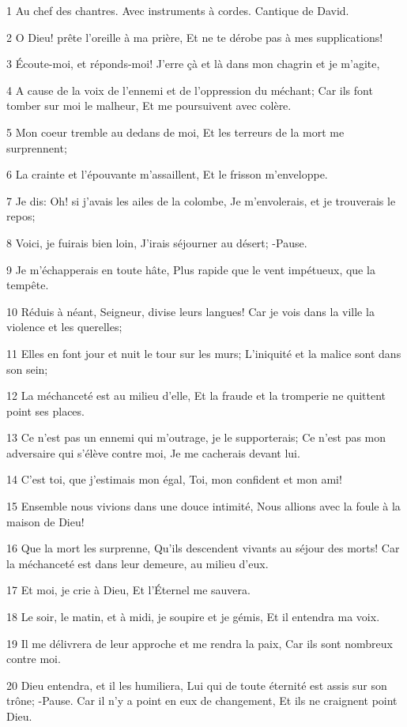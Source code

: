 \par 1 Au chef des chantres. Avec instruments à cordes. Cantique de David.
\par 2 O Dieu! prête l'oreille à ma prière, Et ne te dérobe pas à mes supplications!
\par 3 Écoute-moi, et réponds-moi! J'erre çà et là dans mon chagrin et je m'agite,
\par 4 A cause de la voix de l'ennemi et de l'oppression du méchant; Car ils font tomber sur moi le malheur, Et me poursuivent avec colère.
\par 5 Mon coeur tremble au dedans de moi, Et les terreurs de la mort me surprennent;
\par 6 La crainte et l'épouvante m'assaillent, Et le frisson m'enveloppe.
\par 7 Je dis: Oh! si j'avais les ailes de la colombe, Je m'envolerais, et je trouverais le repos;
\par 8 Voici, je fuirais bien loin, J'irais séjourner au désert; -Pause.
\par 9 Je m'échapperais en toute hâte, Plus rapide que le vent impétueux, que la tempête.
\par 10 Réduis à néant, Seigneur, divise leurs langues! Car je vois dans la ville la violence et les querelles;
\par 11 Elles en font jour et nuit le tour sur les murs; L'iniquité et la malice sont dans son sein;
\par 12 La méchanceté est au milieu d'elle, Et la fraude et la tromperie ne quittent point ses places.
\par 13 Ce n'est pas un ennemi qui m'outrage, je le supporterais; Ce n'est pas mon adversaire qui s'élève contre moi, Je me cacherais devant lui.
\par 14 C'est toi, que j'estimais mon égal, Toi, mon confident et mon ami!
\par 15 Ensemble nous vivions dans une douce intimité, Nous allions avec la foule à la maison de Dieu!
\par 16 Que la mort les surprenne, Qu'ils descendent vivants au séjour des morts! Car la méchanceté est dans leur demeure, au milieu d'eux.
\par 17 Et moi, je crie à Dieu, Et l'Éternel me sauvera.
\par 18 Le soir, le matin, et à midi, je soupire et je gémis, Et il entendra ma voix.
\par 19 Il me délivrera de leur approche et me rendra la paix, Car ils sont nombreux contre moi.
\par 20 Dieu entendra, et il les humiliera, Lui qui de toute éternité est assis sur son trône; -Pause. Car il n'y a point en eux de changement, Et ils ne craignent point Dieu.
